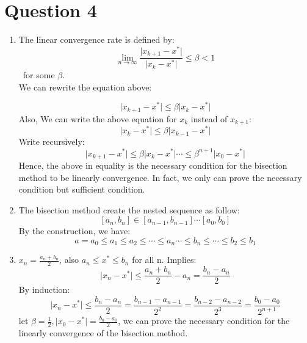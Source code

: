 \documentclass[11pt]{article}
\newcommand{\1}{\mathbbm{1}}
\begin{document}
\section{Question 4}
\begin{enumerate}
\item The linear convergence rate is defined by:
$$\lim_{n \to\infty} \frac{\vert x_{k+1}-x^{*} \vert}{\vert x_{k}-x^{*} \vert} \leq \beta < 1$$\, for some $\beta$.\\
We can rewrite the equation above:

$$
\vert x_{k+1}-x^{*}\vert  \leq \beta \vert x_{k}-x^{*} \vert
$$
Also, We can write the above equation for $x_k$ instead of $x_{k+1}$:
$$\vert x_{k}-x^{*} \vert \leq \beta \vert x_{k-1}-x^{*} \vert
$$
Write recursively:
$$\vert x_{k+1}-x^{*}\vert  \leq \beta \vert x_{k}-x^{*} \vert \cdots \leq \beta^{n+1} \vert x_{0}-x^{*}\vert$$
Hence, the above in equality is the necessary condition for the bisection method to be linearly convergence. In fact, we only can prove the necessary condition but sufficient condition.
\item The bisection method create the nested sequence as follow:
$$[a_n,b_n]\in [a_{n-1},b_{n-1}] \cdots [a_0,b_0]$$
By the construction, we have:
$$a=a_0\leq a_1 \leq a_2 \leq  \cdots \leq a_n \cdots  \leq  b_n \leq \cdots \leq b_2 \leq b_1$$
\item $x_n = \frac{a_n+b_n}{2}$, also $a_n \leq x^* \leq b_n$ for all n.
Implies:
$$\vert x_n -x^* \vert \leq \frac{a_n+b_n}{2} - a_n  = \frac{b_n-a_n}{2}$$
By induction: \\

$$\vert x_n -x^* \vert  \leq \frac{b_n - a_n}{2} =  \frac{b_{n-1} - a_{n-1} }{2^2} =  \frac{b_{n-2} - a_{n-2} }{2^3} =  \frac{b_0 - a_0 }{2^{n+1}}$$
let $\beta = \frac{1}{2}, $$\vert x_0 -x^* \vert  = \frac{b_0-a_0}{2}$, we can prove the necessary condition for the linearly convergence of the bisection method.




\end{enumerate}
\end{document}
